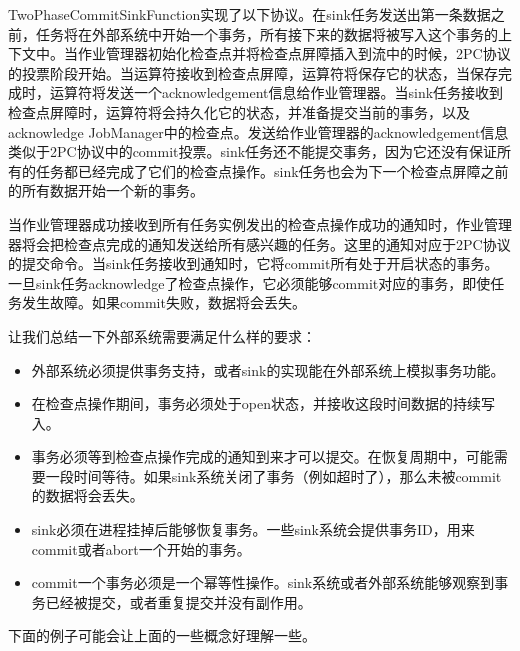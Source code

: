 \documentclass[cn,11pt,chinese]{elegantbook}
\providecommand{\tightlist}{%
  \setlength{\itemsep}{0pt}\setlength{\parskip}{0pt}}
\begin{document}
TwoPhaseCommitSinkFunction实现了以下协议。在sink任务发送出第一条数据之前，任务将在外部系统中开始一个事务，所有接下来的数据将被写入这个事务的上下文中。当作业管理器初始化检查点并将检查点屏障插入到流中的时候，2PC协议的投票阶段开始。当运算符接收到检查点屏障，运算符将保存它的状态，当保存完成时，运算符将发送一个acknowledgement信息给作业管理器。当sink任务接收到检查点屏障时，运算符将会持久化它的状态，并准备提交当前的事务，以及acknowledge
JobManager中的检查点。发送给作业管理器的acknowledgement信息类似于2PC协议中的commit投票。sink任务还不能提交事务，因为它还没有保证所有的任务都已经完成了它们的检查点操作。sink任务也会为下一个检查点屏障之前的所有数据开始一个新的事务。

当作业管理器成功接收到所有任务实例发出的检查点操作成功的通知时，作业管理器将会把检查点完成的通知发送给所有感兴趣的任务。这里的通知对应于2PC协议的提交命令。当sink任务接收到通知时，它将commit所有处于开启状态的事务。一旦sink任务acknowledge了检查点操作，它必须能够commit对应的事务，即使任务发生故障。如果commit失败，数据将会丢失。

让我们总结一下外部系统需要满足什么样的要求：

\begin{itemize}
\tightlist
\item
  外部系统必须提供事务支持，或者sink的实现能在外部系统上模拟事务功能。
\item
  在检查点操作期间，事务必须处于open状态，并接收这段时间数据的持续写入。
\item
  事务必须等到检查点操作完成的通知到来才可以提交。在恢复周期中，可能需要一段时间等待。如果sink系统关闭了事务（例如超时了），那么未被commit的数据将会丢失。
\item
  sink必须在进程挂掉后能够恢复事务。一些sink系统会提供事务ID，用来commit或者abort一个开始的事务。
\item
  commit一个事务必须是一个幂等性操作。sink系统或者外部系统能够观察到事务已经被提交，或者重复提交并没有副作用。
\end{itemize}

下面的例子可能会让上面的一些概念好理解一些。
\end{document}
